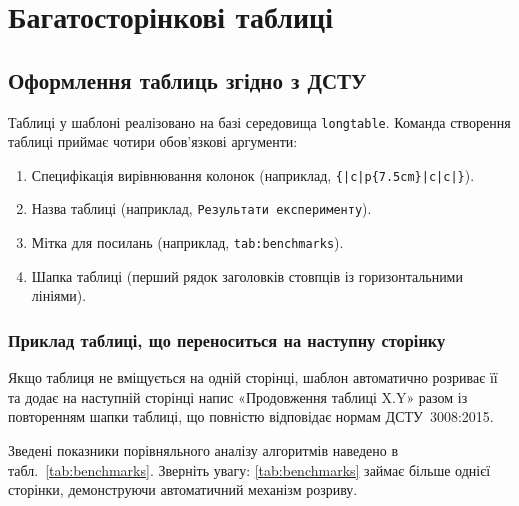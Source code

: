\section{Багатосторінкові таблиці}
\label{sec:tables}

\subsection{Оформлення таблиць згідно з ДСТУ}
\label{subsec:tables-dstu}

Таблиці у шаблоні реалізовано на базі середовища \texttt{longtable}. Команда створення таблиці приймає чотири обов'язкові аргументи:
\begin{enumerate}[wide,beginpenalty=10000]
    \item Специфікація вирівнювання колонок (наприклад, \texttt{\{|c|p\{7.5cm\}|c|c|\}}).
    \item Назва таблиці (наприклад, \texttt{Результати експерименту}).
    \item Мітка для посилань (наприклад, \texttt{tab:benchmarks}).
    \item Шапка таблиці (перший рядок заголовків стовпців із горизонтальними лініями).
\end{enumerate}

\subsubsection{Приклад таблиці, що переноситься на наступну сторінку}
\label{subsubsec:multipage-table}

Якщо таблиця не вміщується на одній сторінці, шаблон автоматично розриває її та додає на наступній сторінці напис «Продовження таблиці X.Y» разом із повторенням шапки таблиці, що повністю відповідає нормам ДСТУ~3008:2015.

Зведені показники порівняльного аналізу алгоритмів наведено в табл.~\ref{tab:benchmarks}. Зверніть увагу: \cref{tab:benchmarks} займає більше однієї сторінки, демонструючи автоматичний механізм розриву.

